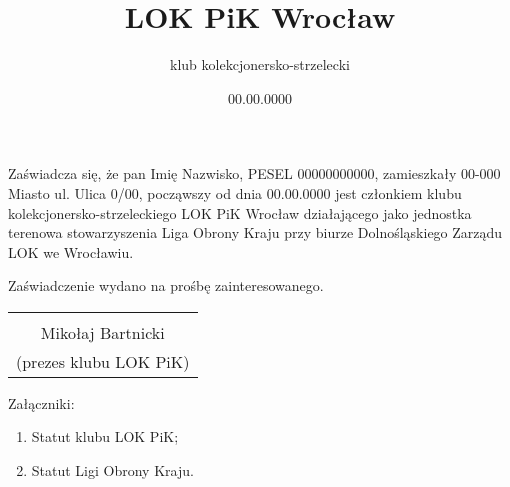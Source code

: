 \documentclass[a4paper,12pt]{article}
\title{LOK PiK Wrocław}
\author{klub kolekcjonersko-strzelecki}
\date{00.00.0000}
\begin{document}
\maketitle
\thispagestyle{empty} %
Zaświadcza się, że pan Imię Nazwisko, PESEL 00000000000, zamieszkały 00-000 Miasto ul. Ulica 0/00, począwszy od dnia 00.00.0000 jest członkiem klubu kolekcjonersko-strzeleckiego LOK PiK Wrocław działającego jako jednostka terenowa stowarzyszenia Liga Obrony Kraju przy biurze Dolnośląskiego Zarządu LOK we Wrocławiu.

Zaświadczenie wydano na prośbę zainteresowanego.
\vspace{4em}
\begin{flushright}
	\begin{tabular}{ c }
		\dotfill\\
		Mikołaj Bartnicki\\
		(prezes klubu LOK PiK)
	\end{tabular}
\end{flushright}
Załączniki:
\begin{enumerate}
	\item Statut klubu LOK PiK;
	\item Statut Ligi Obrony Kraju.
\end{enumerate}
\end{document}
